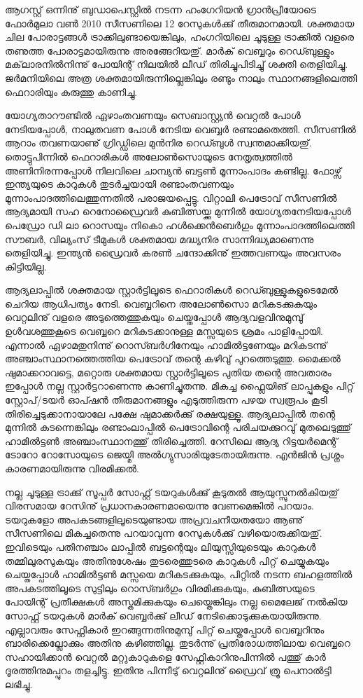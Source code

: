 ﻿
\vskip 2pt

ആഗസ്റ്റ് ഒന്നിനു് ബുഡാപെസ്റ്റില്‍ നടന്ന ഹംഗേറിയന്‍ ഗ്രാന്‍പ്രീയോടെ ഫോര്‍മുലാ വണ്‍ 2010 സീസണിലെ 12 റേസുകള്‍ക്കു് തീരുമാനമായി. ശക്തമായ ചില പോരാട്ടങ്ങള്‍ ട്രാക്കിലുണ്ടായെങ്കിലും, ഹംഗറിയിലെ ചൂടുള്ള ട്രാക്കില്‍ വളരെ തണുത്ത പോരാട്ടമായിരുന്നു അരങ്ങേറിയതു്. മാര്‍ക് വെബ്ബറും റെഡ്ബുള്ളും മക്‌ലാരനില്‍നിന്നു് പോയിന്റ് നിലയില്‍ ലീഡ് തിരിച്ചുപിടിച്ചു് ശക്തി തെളിയിച്ചു. ജര്‍മനിയിലെ അത്ര ശക്തമായിരുന്നില്ലെങ്കിലും രണ്ടും നാലും സ്ഥാനങ്ങളിലെത്തി ഫെറാരിയും കരുത്തു കാണിച്ചു.

യോഗ്യതാറൗണ്ടില്‍ ഏഴാംതവണയും സെബാസ്റ്റ്യന്‍ വെറ്റല്‍ പോള്‍ നേടിയപ്പോള്‍, നാലുതവണ പോള്‍ നേടിയ 
വെബ്ബര്‍ രണ്ടാമതെത്തി. സീസണില്‍ ആറാം തവണയാണു് ഗ്രിഡ്ഡിലെ മുന്‍നിര റെഡ്ബുള്‍ സ്വന്തമാക്കിയതു്. 
തൊട്ടുപിന്നില്‍ ഫെറാരികള്‍ അലോണ്‍സൊയുടെ നേതൃത്വത്തില്‍ അണിനിരന്നപ്പോള്‍ നിലവിലെ ചാമ്പ്യന്‍ ബട്ടണ്‍ 
മൂന്നാംപാദം കണ്ടില്ല. ഫോഴ്സ് ഇന്ത്യയുടെ കാറുകള്‍ തുടര്‍ച്ചയായി രണ്ടാംതവണയും മൂന്നാംപാദത്തിലെത്തുന്നതില്‍ 
പരാജയപ്പെട്ടു. വിറ്റാലി പെട്രോവ് സീസണില്‍ ആദ്യമായി സഹ റെനോഡ്രൈവര്‍ കുബിത്സയ്ക്കു മുന്നില്‍ 
യോഗ്യതനേടിയപ്പോള്‍ പെഡ്രോ ഡി ലാ റൊസയും നികൊ ഹള്‍ക്കെന്‍ബെര്‍ഗും മൂന്നാംപാദത്തിലെത്തി സൗബര്‍, 
വില്യംസ് ടീമുകള്‍ ശക്തമായ മദ്ധ്യനിര സാന്നിദ്ധ്യമാണെന്നു തെളിയിച്ചു. ഇന്ത്യന്‍ ഡ്രൈവര്‍ കരണ്‍ ചന്ദോക്കിനു് 
ഇത്തവണയും അവസരം കിട്ടിയില്ല.

ആദ്യലാപ്പില്‍ ശക്തമായ സ്റ്റാര്‍ട്ടിലൂടെ ഫെറാരികള്‍ റെഡ്ബുള്ളുകളുടെമേല്‍ ചെറിയ ആധിപത്യം നേടി.  
വെബ്ബറിനെ അലോണ്‍സൊ മറികടക്കുകയും വെറ്റലിനു് വളരെ അടുത്തെത്തുകയും ചെയ്തപ്പോള്‍ ആദ്യവളവിനുമുമ്പു് ഉള്‍വശത്തുകൂടെ 
വെബ്ബറെ മറികടക്കാനുള്ള മസ്സയുടെ ശ്രമം പാളിപ്പോയി. എന്നാല്‍ ഏഴാമതുനിന്നു് റൊസ്ബര്‍ഗിനേയും ഹാമില്‍ട്ടണേയും
മറികടന്നു് അഞ്ചാംസ്ഥാനത്തെത്തിയ പെട്രോവ് തന്റെ കഴിവു് പുറത്തെടുത്തു. മൈക്കല്‍ ഷുമാക്കറാവട്ടെ, മറ്റൊരു 
ശക്തമായ സ്റ്റാര്‍ട്ടിലൂടെ പുതിയ തന്റെ അവതാരം ഇപ്പോള്‍ നല്ല സ്റ്റാര്‍ട്ടറാണെന്നു കാണിച്ചുതന്നു. മികച്ച ഫ്ലൈയിങ് 
ലാപ്പുകളും പിറ്റ് സ്റ്റോപ്/ടയര്‍ ഓപ്ഷന്‍ തീരുമാനങ്ങളും എടുത്തിരുന്ന പഴയ സ്വരൂപം കൂടി തിരിച്ചെടുക്കാനായാലേ പക്ഷേ 
ഷുമാക്കര്‍ക്കു് രക്ഷയുള്ളൂ. ആദ്യലാപ്പില്‍ തന്റെ മുന്നില്‍ കടന്നെങ്കിലും രണ്ടാംലാപ്പില്‍ പെട്രോവിന്റെ പരിചയക്കുറവു് 
മുതലെടുത്തു് ഹാമില്‍ട്ടണ്‍ അഞ്ചാംസ്ഥാനത്തു് തിരിച്ചെത്തി. റേസിലെ ആദ്യ റിട്ടയര്‍മെന്റ് ടോറോ റോസോയുടെ 
ജെയ്മി അല്‍ഗ്യുസാരിയുടേതായിരുന്നു. എന്‍ജിന്‍ പ്രശ്നം കാരണമായിരുന്നു വിരമിക്കല്‍.

നല്ല ചൂടുള്ള ട്രാക്കു് സൂപ്പര്‍ സോഫ്റ്റ് ടയറുകള്‍ക്കു് കൂടുതല്‍ ആയുസ്സുനല്‍കിയതു് വിരസമായ റേസിനു് 
പ്രധാനകാരണമായെന്നു വേണമെങ്കില്‍ പറയാം. ടയറുകളോ അപകടങ്ങളിലൂടെയുണ്ടായ അപ്രവചനീയതയോ ആണു് 
സീസണിലെ മികച്ചതെന്നു പറയാവുന്ന റേസുകള്‍ക്കു് വഴിയൊരുക്കിയതു്. ഇവിടെയും പതിനഞ്ചാം ലാപ്പില്‍ ബട്ടന്റെയും 
ലിയുസ്സിയുടെയും കാറുകള്‍ തമ്മിലുരസുകയും അതിനുശേഷം തുടരെത്തുടരെ കാറുകള്‍ പിറ്റ് ചെയ്യുകയും ചെയ്തപ്പോള്‍ 
ഹാമില്‍ട്ടണ്‍ മസ്സയെ മറികടക്കുകയും, പിറ്റില്‍ നടന്ന ബഹളത്തില്‍ അപകടത്തിലൂടെ സുട്ടിലും റൊസ്ബര്‍ഗും 
വിരമിക്കുകയും, കുബിത്സയുടെ പോയിന്റ് പ്രതീക്ഷകള്‍ അസ്തമിക്കുകയും ചെയ്തെങ്കിലും നല്ല മൈലേജ് നല്‍കിയ സോഫ്റ്റ് 
ടയറുകള്‍ മാര്‍ക് വെബ്ബര്‍ക്കു് ലീഡ് നേടിക്കൊടുക്കുകയായിരുന്നു. എല്ലാവരും സേഫ്റ്റികാര്‍ ഇറങ്ങുന്നതിനുമുമ്പു് പിറ്റ് 
ചെയ്തപ്പോള്‍ വെബ്ബറിനും ബാരിക്കെല്ലോക്കും അതിനു കഴിഞ്ഞില്ല. തുടര്‍ന്നു് പ്രതിരോധത്തിലായ വെബ്ബറെ സഹായിക്കാന്‍ 
വെറ്റല്‍ മറ്റുകാറുകളെ സേഫ്റ്റികാറിനുപിന്നില്‍ പത്തു് കാര്‍ ദൂരത്തിനുമപ്പുറം തളച്ചിട്ടു. ഇതിനു പിന്നീടു് വെറ്റലിനു് ഡ്രൈവ് 
ത്രൂ പെനാല്‍ട്ടി ലഭിച്ചു.


